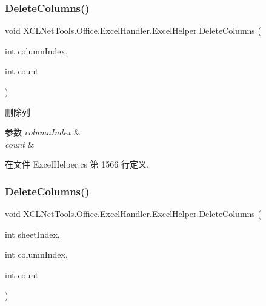 \subsubsection{\texorpdfstring{Delete\+Columns()}{DeleteColumns()}\hspace{0.1cm}{\footnotesize\ttfamily [1/2]}}
{\footnotesize\ttfamily void X\+C\+L\+Net\+Tools.\+Office.\+Excel\+Handler.\+Excel\+Helper.\+Delete\+Columns (\begin{DoxyParamCaption}\item[{int}]{column\+Index,  }\item[{int}]{count }\end{DoxyParamCaption})}



删除列 


\begin{DoxyParams}{参数}
{\em column\+Index} & \\
\hline
{\em count} & \\
\hline
\end{DoxyParams}


在文件 Excel\+Helper.\+cs 第 1566 行定义.

\mbox{\label{class_x_c_l_net_tools_1_1_office_1_1_excel_handler_1_1_excel_helper_ace21012f5684de3daa81e9869ddf2183}} 
\subsubsection{\texorpdfstring{Delete\+Columns()}{DeleteColumns()}\hspace{0.1cm}{\footnotesize\ttfamily [2/2]}}
{\footnotesize\ttfamily void X\+C\+L\+Net\+Tools.\+Office.\+Excel\+Handler.\+Excel\+Helper.\+Delete\+Columns (\begin{DoxyParamCaption}\item[{int}]{sheet\+Index,  }\item[{int}]{column\+Index,  }\item[{int}]{count }\end{DoxyParamCaption})}



